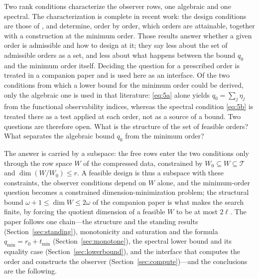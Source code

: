 ﻿\documentclass[journal]{IEEEtran}
\theoremstyle{plainn}
\theoremstyle{remark}
\begin{document}
Two rank conditions characterize the observer rows, one algebraic and one spectral. The
characterization is complete in recent work: the design conditions are those of \cite{fer10,dar25}, and
\cite{fer26a,fer26b} determine, order by order, which orders are attainable, together with a
construction at the minimum order. Those results answer whether a given order is admissible and how to
design at it; they say less about the set of admissible orders as a set, and less about what happens
between the bound $q_0$ and the minimum order itself. Deciding the question for a prescribed order is
treated in a companion paper \cite{companion1} and is used here as an interface. Of the two conditions
from which a lower bound for the minimum order could be derived, only the algebraic one is used in that
literature: \eqref{eq:5a}
alone yields $q_0=\sum_j\eta_j$ from the functional observability indices, whereas the spectral
condition \eqref{eq:5b} is treated there as a test applied at each order, not as a source
of a bound. Two questions are therefore open. What is the structure of the set of feasible orders? What
separates the algebraic bound $q_0$ from the minimum order?

The answer is carried by a subspace: the free rows enter the two conditions only through the row space
$W$ of the compressed data, constrained by $W_0\subseteq W\subseteq\mathcal T$ and
$\dim(W/W_0)\le r$. A feasible design is thus a subspace with these constraints, the observer conditions
depend on $W$ alone, and the minimum-order question becomes a constrained dimension-minimization
problem; the structural bound $\omega+1\le\dim W\le2\omega$ of the companion paper is what makes the
search finite, by forcing the quotient dimension of a feasible $W$ to be at most $2\ell$. The paper
follows one chain---the structure and the standing results (Section~\ref{sec:standing}), monotonicity
and saturation and the formula $q_{\min}=r_0+t_{\min}$ (Section~\ref{sec:monotone}), the spectral lower
bound and its equality case (Section~\ref{sec:lowerbound}), and the interface that computes the order
and constructs the observer (Section~\ref{sec:compute})---and the conclusions are the following.
\end{document}
